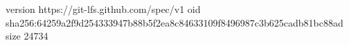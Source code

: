 version https://git-lfs.github.com/spec/v1
oid sha256:64259a2f9d254333947b88b5f2ea8c84633109f8496987c3b625cadb81bc88ad
size 24734
